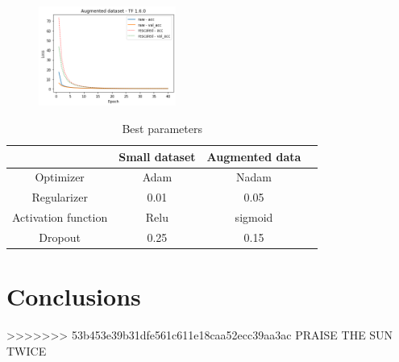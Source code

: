 \documentclass[prl,twocolumn]{revtex4-1}
\begin{document}
\begin{figure}[h!!]
	\includegraphics[width=0.40\textwidth]{aug_oldTFloss.png}
	\caption{}
	\label{fig:y}
\end{figure}
\begin{table}[ht]
\caption{Best parameters}
\begin{tabular}{c c c c}
\hline\hline
 & Small dataset & Augmented data &  \\ [0.5ex]
\hline
Optimizer & Adam & Nadam &   \\
Regularizer & 0.01 & 0.05 &  \\
Activation function & Relu & sigmoid &  \\Dropout & 0.25 & 0.15 &  \\ [1ex]
\hline
\end{tabular}
\label{table:nonlin}
\end{table}
\section{Conclusions}

>>>>>>> 53b453e39b31dfe561c611e18caa52ecc39aa3ac
PRAISE THE SUN TWICE

  





\begin{thebibliography}{99}


  
\end{thebibliography}
\end{document}
